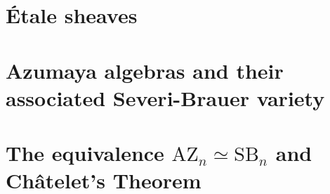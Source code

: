 \documentclass{../util/zariski}
\newcommand{\SB}{\mathrm{SB}}
\newcommand{\AZ}{\mathrm{AZ}}
\begin{document}
\tableofcontents

\section{\'Etale sheaves}


\section{Azumaya algebras and their associated Severi-Brauer variety}


\section{The equivalence $\AZ_n\simeq \SB_n$ and Ch\^atelet's Theorem}


\printindex

\printbibliography
\end{document}
